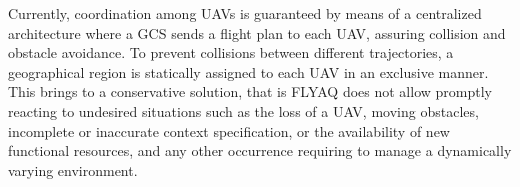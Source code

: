 \documentclass[letterpaper, 10 pt, conference]{ieeeconf}
\begin{document}
%
%
Currently, coordination among UAVs is guaranteed by means of a centralized architecture where a GCS sends a flight plan to each UAV, assuring collision and obstacle avoidance. 
To prevent collisions between different trajectories, a geographical region is statically assigned to each UAV in an exclusive manner.
This brings to a conservative solution, that is FLYAQ does not allow promptly reacting to undesired situations such as the loss of a UAV, moving obstacles, incomplete or inaccurate context specification, or the availability of new functional resources, and any other occurrence requiring to manage a dynamically varying environment.

%
%
\end{document}
